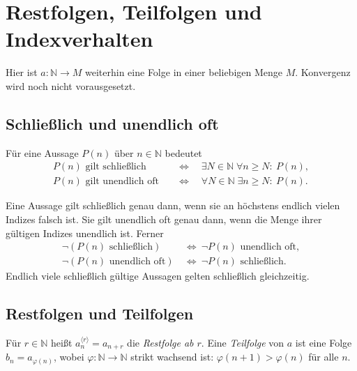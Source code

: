 \chapter{Restfolgen, Teilfolgen und Indexverhalten}
\label{b21guide:ch:subsequences}

Hier ist $a\colon\mathbb N\to M$ weiterhin eine Folge in einer
beliebigen Menge $M$. Konvergenz wird noch nicht vorausgesetzt.

\section{Schließlich und unendlich oft}

\begin{definition}
\label{b21guide:def:eventually}
Für eine Aussage $P(n)$ über $n\in\mathbb N$ bedeutet
\[
 \begin{aligned}
 P(n)\text{ gilt schließlich}
 &\quad\Longleftrightarrow\quad
 \exists N\in\mathbb N\;\forall n\geq N:\ P(n),\\
 P(n)\text{ gilt unendlich oft}
 &\quad\Longleftrightarrow\quad
 \forall N\in\mathbb N\;\exists n\geq N:\ P(n).
 \end{aligned}
\]
\end{definition}

\begin{theorem}
Eine Aussage gilt schließlich genau dann, wenn sie an höchstens
endlich vielen Indizes falsch ist. Sie gilt unendlich oft genau
dann, wenn die Menge ihrer gültigen Indizes unendlich ist. Ferner
\[
 \begin{aligned}
 \neg(P(n)\text{ schließlich})
 &\ \Longleftrightarrow\ \neg P(n)\text{ unendlich oft},\\
 \neg(P(n)\text{ unendlich oft})
 &\ \Longleftrightarrow\ \neg P(n)\text{ schließlich}.
 \end{aligned}
\]
Endlich viele schließlich gültige Aussagen gelten schließlich
gleichzeitig.
\end{theorem}

\section{Restfolgen und Teilfolgen}

\begin{definition}
\label{b21guide:def:subsequence}
Für $r\in\mathbb N$ heißt
$a^{\langle r\rangle}_n=a_{n+r}$ die \emph{Restfolge ab $r$}.
Eine \emph{Teilfolge} von $a$ ist eine Folge
$b_n=a_{\varphi(n)}$, wobei
$\varphi\colon\mathbb N\to\mathbb N$ strikt wachsend ist:
$\varphi(n+1)>\varphi(n)$ für alle $n$.
\end{definition}

